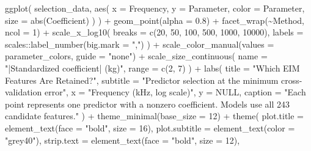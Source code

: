 \documentclass[
  letterpaper,
  DIV=11,
  numbers=noendperiod]{scrreprt}
\newenvironment{Shaded}{\begin{snugshade}}{\end{snugshade}}
\newcommand{\AttributeTok}[1]{\textcolor[rgb]{0.40,0.45,0.13}{#1}}
\newcommand{\ConstantTok}[1]{\textcolor[rgb]{0.56,0.35,0.01}{#1}}
\newcommand{\DecValTok}[1]{\textcolor[rgb]{0.68,0.00,0.00}{#1}}
\newcommand{\FloatTok}[1]{\textcolor[rgb]{0.68,0.00,0.00}{#1}}
\newcommand{\FunctionTok}[1]{\textcolor[rgb]{0.28,0.35,0.67}{#1}}
\newcommand{\NormalTok}[1]{\textcolor[rgb]{0.00,0.23,0.31}{#1}}
\newcommand{\SpecialCharTok}[1]{\textcolor[rgb]{0.37,0.37,0.37}{#1}}
\newcommand{\StringTok}[1]{\textcolor[rgb]{0.13,0.47,0.30}{#1}}
\newcounter{none} %
\begin{document}
\begin{Shaded}
\begin{Highlighting}[]
\FunctionTok{ggplot}\NormalTok{(}
\NormalTok{  selection\_data,}
  \FunctionTok{aes}\NormalTok{(}
    \AttributeTok{x =}\NormalTok{ Frequency,}
    \AttributeTok{y =}\NormalTok{ Parameter,}
    \AttributeTok{color =}\NormalTok{ Parameter,}
    \AttributeTok{size =} \FunctionTok{abs}\NormalTok{(Coefficient)}
\NormalTok{  )}
\NormalTok{) }\SpecialCharTok{+}
  \FunctionTok{geom\_point}\NormalTok{(}\AttributeTok{alpha =} \FloatTok{0.8}\NormalTok{) }\SpecialCharTok{+}
  \FunctionTok{facet\_wrap}\NormalTok{(}\SpecialCharTok{\textasciitilde{}}\NormalTok{Method, }\AttributeTok{ncol =} \DecValTok{1}\NormalTok{) }\SpecialCharTok{+}
  \FunctionTok{scale\_x\_log10}\NormalTok{(}
    \AttributeTok{breaks =} \FunctionTok{c}\NormalTok{(}\DecValTok{20}\NormalTok{, }\DecValTok{50}\NormalTok{, }\DecValTok{100}\NormalTok{, }\DecValTok{500}\NormalTok{, }\DecValTok{1000}\NormalTok{, }\DecValTok{10000}\NormalTok{),}
    \AttributeTok{labels =}\NormalTok{ scales}\SpecialCharTok{::}\FunctionTok{label\_number}\NormalTok{(}\AttributeTok{big.mark =} \StringTok{","}\NormalTok{)}
\NormalTok{  ) }\SpecialCharTok{+}
  \FunctionTok{scale\_color\_manual}\NormalTok{(}\AttributeTok{values =}\NormalTok{ parameter\_colors, }\AttributeTok{guide =} \StringTok{"none"}\NormalTok{) }\SpecialCharTok{+}
  \FunctionTok{scale\_size\_continuous}\NormalTok{(}
    \AttributeTok{name =} \StringTok{"|Standardized coefficient| (kg)"}\NormalTok{,}
    \AttributeTok{range =} \FunctionTok{c}\NormalTok{(}\DecValTok{2}\NormalTok{, }\DecValTok{7}\NormalTok{)}
\NormalTok{  ) }\SpecialCharTok{+}
  \FunctionTok{labs}\NormalTok{(}
    \AttributeTok{title =} \StringTok{"Which EIM Features Are Retained?"}\NormalTok{,}
    \AttributeTok{subtitle =} \StringTok{"Predictor selection at the minimum cross{-}validation error"}\NormalTok{,}
    \AttributeTok{x =} \StringTok{"Frequency (kHz, log scale)"}\NormalTok{,}
    \AttributeTok{y =} \ConstantTok{NULL}\NormalTok{,}
    \AttributeTok{caption =} \StringTok{"Each point represents one predictor with a nonzero coefficient. Models use all 243 candidate features."}
\NormalTok{  ) }\SpecialCharTok{+}
  \FunctionTok{theme\_minimal}\NormalTok{(}\AttributeTok{base\_size =} \DecValTok{12}\NormalTok{) }\SpecialCharTok{+}
  \FunctionTok{theme}\NormalTok{(}
    \AttributeTok{plot.title =} \FunctionTok{element\_text}\NormalTok{(}\AttributeTok{face =} \StringTok{"bold"}\NormalTok{, }\AttributeTok{size =} \DecValTok{16}\NormalTok{),}
    \AttributeTok{plot.subtitle =} \FunctionTok{element\_text}\NormalTok{(}\AttributeTok{color =} \StringTok{"grey40"}\NormalTok{),}
    \AttributeTok{strip.text =} \FunctionTok{element\_text}\NormalTok{(}\AttributeTok{face =} \StringTok{"bold"}\NormalTok{, }\AttributeTok{size =} \DecValTok{12}\NormalTok{),}

\end{Highlighting}
\end{Shaded}
\end{document}
